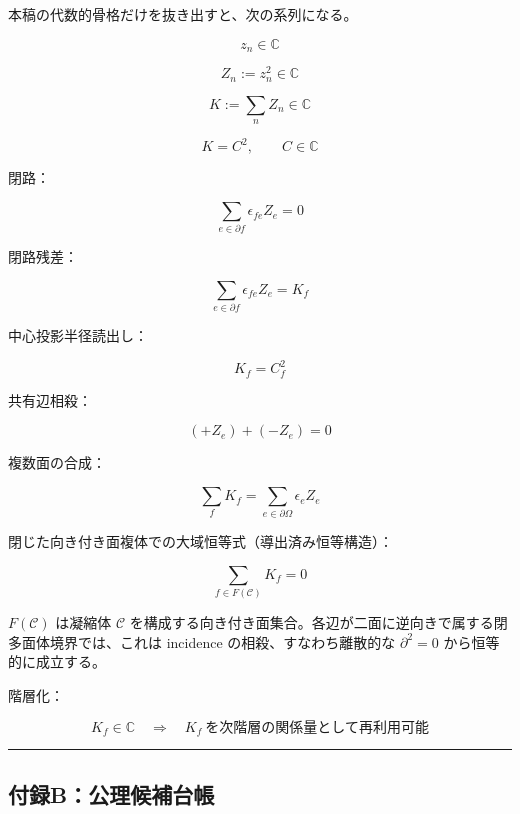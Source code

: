 \documentclass[
  a4paper,
]{ltjsarticle}
\begin{document}
本稿の代数的骨格だけを抜き出すと、次の系列になる。

\[
z_n\in\mathbb C
\]

\[
Z_n:=z_n^2\in\mathbb C
\]

\[
K:=\sum_n Z_n\in\mathbb C
\]

\[
K=C^2,\qquad C\in\mathbb C
\]

閉路：

\[
\sum_{e\in\partial f}\epsilon_{fe}Z_e=0
\]

閉路残差：

\[
\sum_{e\in\partial f}\epsilon_{fe}Z_e=K_f
\]

中心投影半径読出し：

\[
K_f=C_f^2
\]

共有辺相殺：

\[
(+Z_e)+(-Z_e)=0
\]

複数面の合成：

\[
\sum_f K_f=\sum_{e\in\partial\Omega}\epsilon_e Z_e
\]

閉じた向き付き面複体での大域恒等式（導出済み恒等構造）：

\[
\boxed{\sum_{f\in F(\mathcal C)}K_f=0}
\]

\(F(\mathcal C)\) は凝縮体 \(\mathcal C\)
を構成する向き付き面集合。各辺が二面に逆向きで属する閉多面体境界では、これは
incidence の相殺、すなわち離散的な \(\partial^2=0\)
から恒等的に成立する。

階層化：

\[
K_f\in\mathbb C\quad\Rightarrow\quad K_f\ \text{を次階層の関係量として再利用可能}
\]

\begin{center}\rule{0.5\linewidth}{0.5pt}\end{center}

\subsection{付録B：公理候補台帳}\label{ux4ed8ux9332bux516cux7406ux5019ux88dcux53f0ux5e33}
\end{document}

